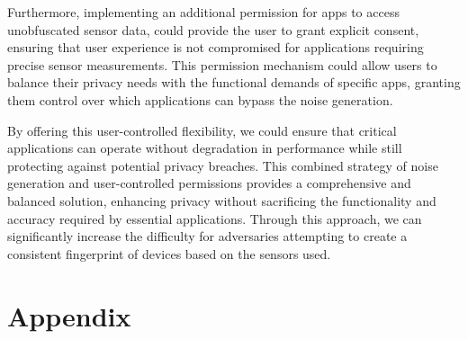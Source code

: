 \documentclass[11pt,
  oneside,openany,    %
]{scrreprt}
\begin{document}
Furthermore, implementing an additional permission for apps to access unobfuscated sensor data, could provide the user to grant explicit consent, ensuring that user experience is not compromised for applications requiring precise sensor measurements.
This permission mechanism could allow users to balance their privacy needs with the functional demands of specific apps, granting them control over which applications can bypass the noise generation.

By offering this user-controlled flexibility, we could ensure that critical applications can operate without degradation in performance while still protecting against potential privacy breaches.
This combined strategy of noise generation and user-controlled permissions provides a comprehensive and balanced solution, enhancing privacy without sacrificing the functionality and accuracy required by essential applications. 
Through this approach, we can significantly increase the difficulty for adversaries attempting to create a consistent fingerprint of devices based on the sensors used. 



\printbibliography[heading=bibintoc]

\appendix

\chapter{Appendix}
\label{chap:appendix}

\end{document}
